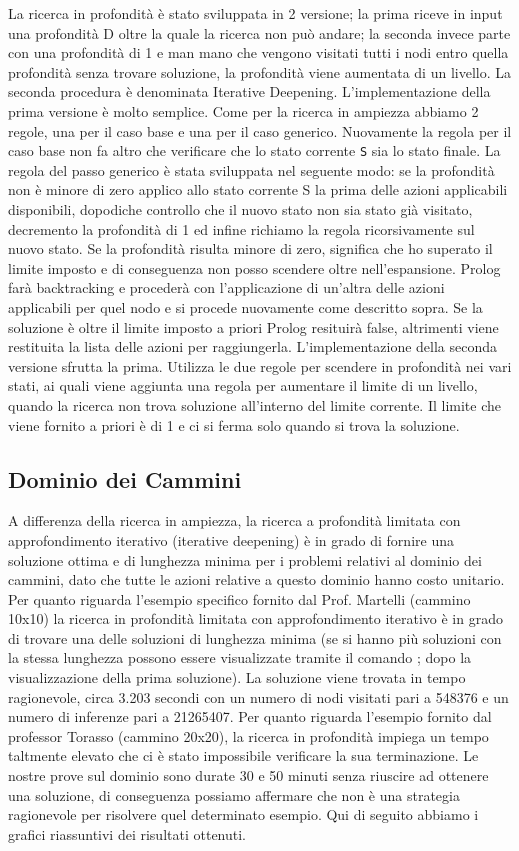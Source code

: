 La ricerca in profondità è stato sviluppata in 2 versione; la prima riceve in input una profondità D oltre la quale la ricerca non può andare; la seconda invece parte con una profondità di 1 e man mano che vengono visitati tutti i nodi entro quella profondità senza trovare soluzione, la profondità viene aumentata di un livello. La seconda procedura è denominata Iterative Deepening.
L'implementazione della prima versione è molto semplice. Come per la ricerca in ampiezza abbiamo 2 regole, una per il caso base e una per il caso generico. Nuovamente la regola per il caso base non fa altro che verificare che lo stato corrente \lstinline{S} sia lo stato finale. La regola del passo generico è stata sviluppata nel seguente modo: se la profondità non è minore di zero applico allo stato corrente S la prima delle azioni applicabili disponibili, dopodiche controllo che il nuovo stato non sia stato già visitato, decremento la profondità di 1 ed infine richiamo la regola ricorsivamente sul nuovo stato. Se la profondità risulta minore di zero, significa che ho superato il limite imposto e di conseguenza non posso scendere oltre nell'espansione.
Prolog farà backtracking e procederà con l'applicazione di un'altra delle azioni applicabili per quel nodo e si procede nuovamente come descritto sopra. Se la soluzione è oltre il limite imposto a priori Prolog resituirà false, altrimenti viene restituita la lista delle azioni per raggiungerla.
L'implementazione della seconda versione sfrutta la prima. Utilizza le due regole per scendere in profondità nei vari stati, ai quali viene aggiunta una regola per aumentare il limite di un livello, quando la ricerca non trova soluzione all'interno del limite corrente. Il limite che viene fornito a priori è di 1 e ci si ferma solo quando si trova la soluzione.


\subsection{Dominio dei Cammini}
A differenza della ricerca in ampiezza, la ricerca a profondità limitata con approfondimento iterativo (iterative deepening) è in grado di fornire una soluzione ottima e di lunghezza minima per i problemi relativi al dominio dei cammini, dato che tutte le azioni relative a questo dominio hanno costo unitario. Per quanto riguarda l'esempio specifico fornito dal Prof. Martelli (cammino 10x10) la ricerca in profondità limitata con approfondimento iterativo è in grado di trovare una delle soluzioni di lunghezza minima (se si hanno più soluzioni con la stessa lunghezza possono essere visualizzate tramite il comando ; dopo la visualizzazione della prima soluzione). La soluzione viene trovata in tempo ragionevole, circa 3.203 secondi con un numero di nodi visitati pari a 548376 e un numero di inferenze pari a 21265407. Per quanto riguarda l'esempio fornito dal professor Torasso (cammino 20x20), la ricerca in profondità impiega un tempo taltmente elevato che ci è stato impossibile verificare la sua terminazione. Le nostre prove sul dominio sono durate 30 e 50 minuti senza riuscire ad ottenere una soluzione, di conseguenza possiamo affermare che non è una strategia ragionevole per risolvere quel determinato esempio.
Qui di seguito abbiamo i grafici riassuntivi dei risultati ottenuti.

